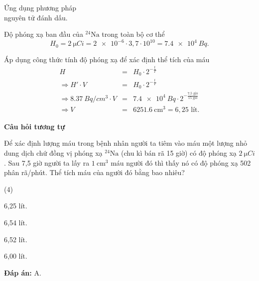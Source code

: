 \begin{dang}{Ứng dụng phương pháp\\ nguyên tử đánh dấu.}
{		Độ phóng xạ ban đầu của $^{24}\text{Na}$ trong toàn bộ cơ thể
		\begin{equation*}
			H_0=\SI{2}{\micro Ci}=\num{2e-6} \cdot 3,7 \cdot 10^{10}=\SI{7,4e4}{Bq}.
		\end{equation*}
		
		Áp dụng công thức tính độ phóng xạ để xác định thể tích của máu
		\begin{eqnarray*}
			H&=&H_0\cdot 2^{-\frac{t}{T}}\\
			\Rightarrow H'\cdot V&=&H_0\cdot 2^{-\frac{t}{T}}\\
			\Rightarrow \SI{8,37}{Bq/cm^3}\cdot V&=&\SI{7,4e4}{Bq}\cdot2^{-\frac{\text{7,5 giờ}}{\text{15 giờ}}}\\
			\Rightarrow V&=&\SI{6251,6}{\centi\meter^3}=6,25\textrm{ lít}.
		\end{eqnarray*}
		
		\begin{center}
			\textbf{Câu hỏi tương tự}
		\end{center}		
		
		Để xác định lượng máu trong bệnh nhân người ta tiêm vào máu một lượng nhỏ dung dịch chứ đồng vị phóng xạ $^{24}\text{Na}$ (chu kì bán rã 15 giờ) có độ phóng xạ $\SI{2}{\micro Ci}$. Sau 7,5 giờ người ta lấy ra $\SI{1}{\centi\meter^3}$ máu người đó thì thấy nó có độ phóng xạ 502 phân rã/phút. Thể tích máu của người đó bằng bao nhiêu?
		
		\begin{mcq}(4)
			\item 6,25 lít.
			\item 6,54 lít.
			\item 6,52 lít.
			\item 6,00 lít.
		\end{mcq}
		
		\textbf{Đáp án:} A.}
\end{dang}

